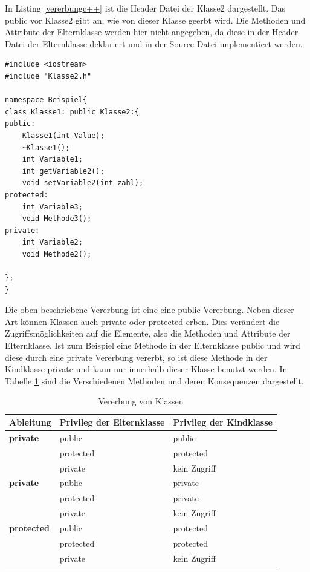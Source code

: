 In Listing \ref{vererbungc++} ist die Header Datei der Klasse2 dargestellt. Das  \glqq public\grqq{} vor Klasse2 gibt an, wie von dieser Klasse geerbt wird. Die Methoden und Attribute der Elternklasse werden hier nicht angegeben, da diese in der Header Datei der Elternklasse deklariert und in der Source Datei implementiert werden.
\begin{lstlisting}[caption =Vererbung in c++,label=vererbungc++]
#include <iostream>
#include "Klasse2.h"

namespace Beispiel{
class Klasse1: public Klasse2:{
public:
	Klasse1(int Value);
	~Klasse1();
	int Variable1;
	int getVariable2();
	void setVariable2(int zahl);
protected:
	int Variable3;
	void Methode3();
private:
	int Variable2;
	void Methode2();

};
}
\end{lstlisting}




Die oben beschriebene Vererbung ist eine eine \glqq public\grqq{} Vererbung. Neben dieser Art können Klassen auch \glqq private\grqq{} oder \glqq protected\grqq{} erben. Dies verändert die Zugriffsmöglichkeiten auf die Elemente, also die Methoden und Attribute der Elternklasse.
Ist zum Beispiel eine Methode in der Elternklasse  \glqq public\grqq{} und wird diese durch eine \glqq private\grqq{} Vererbung vererbt, so ist diese Methode in der Kindklasse \glqq private\grqq{} und kann nur innerhalb dieser Klasse benutzt werden.
In Tabelle \ref{vererbungKlassen} sind die Verschiedenen Methoden und deren Konsequenzen dargestellt.
\begin{table}[H]
	\centering
	\begin{tabular}{|l|l|l|}
		\hline
		\textbf{Ableitung} & \textbf{Privileg der Elternklasse} & \textbf{Privileg der Kindklasse} \\ \hline
		\textbf{private}   & public                             & public                           \\ \hline
		& protected                          & protected                        \\ \hline
		& private                            & kein Zugriff                     \\ \hline
		\textbf{private}   & public                             & private                          \\ \hline
		& protected                          & private                          \\ \hline
		& private                            & kein Zugriff                     \\ \hline
		\textbf{protected} & public                             & protected                        \\ \hline
		& protected                          & protected                        \\ \hline
		& private                            & kein Zugriff                     \\ \hline
	\end{tabular}
\caption[Vererbung von Klassen]{Vererbung von Klassen}
\label{vererbungKlassen}
\end{table}

